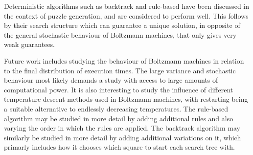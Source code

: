 \documentclass[a4paper,11pt]{kth-mag}
\begin{document}
Deterministic algorithms such as backtrack and rule-based have been discussed in the context of puzzle generation, and are considered to perform well.
This follows by their search structure which can guarantee a unique solution, in opposite of the general stochastic behaviour of Boltzmann machines, that only gives very weak guarantees.

Future work includes studying the behaviour of Boltzmann machines in relation to the final distribution of execution times.
The large variance and stochastic behaviour most likely demands a study with access to large amounts of computational power.
It is also interesting to study the influence of different temperature descent methods used in Boltzmann machines, with restarting being a suitable alternative to endlessly decreasing temperatures.
The rule-based algorithm may be studied in more detail by adding additional rules and also varying the order in which the rules are applied.
The backtrack algorithm may similarly be studied in more detail by adding additional variations on it, which primarly includes how it chooses which square to start each search tree with.
\end{document}
